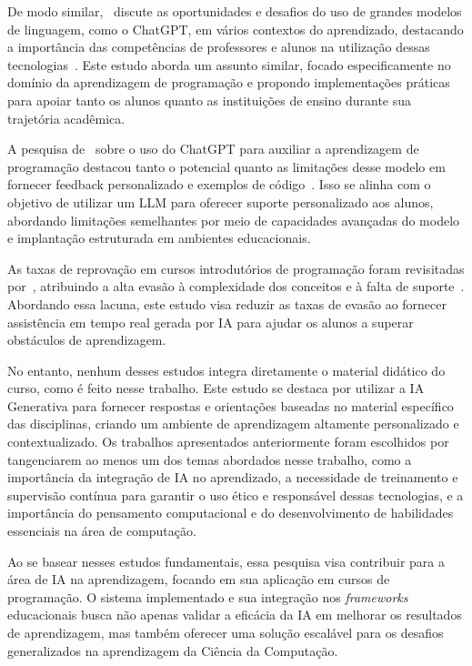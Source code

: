 \documentclass[journal]{IEEEtran}
\begin{document}
De modo similar,~\cite{kasneci2023chatgpt} discute as oportunidades e desafios do uso de grandes modelos de linguagem, como o ChatGPT, em vários contextos do aprendizado, destacando a importância das competências de professores e alunos na utilização dessas tecnologias~\cite{kasneci2023chatgpt}.
Este estudo aborda um assunto similar, focado especificamente no domínio da aprendizagem de programação e propondo implementações práticas para apoiar tanto os alunos quanto as instituições de ensino durante sua trajetória acadêmica.

A pesquisa de~\cite{da2023chatgpt} sobre o uso do ChatGPT para auxiliar a aprendizagem de programação destacou tanto o potencial quanto as limitações desse modelo em fornecer feedback personalizado e exemplos de código~\cite{da2023chatgpt}.
Isso se alinha com o objetivo de utilizar um LLM para oferecer suporte personalizado aos alunos, abordando limitações semelhantes por meio de capacidades avançadas do modelo e implantação estruturada em ambientes educacionais.

As taxas de reprovação em cursos introdutórios de programação foram revisitadas por~\cite{watson2014failure}, atribuindo a alta evasão à complexidade dos conceitos e à falta de suporte~\cite{watson2014failure}.
Abordando essa lacuna, este estudo visa reduzir as taxas de evasão ao fornecer assistência em tempo real gerada por IA para ajudar os alunos a superar obstáculos de aprendizagem.

No entanto, nenhum desses estudos integra diretamente o material didático do curso, como é feito nesse trabalho.
Este estudo se destaca por utilizar a IA Generativa para fornecer respostas e orientações baseadas no material específico das disciplinas, criando um ambiente de aprendizagem altamente personalizado e contextualizado.
Os trabalhos apresentados anteriormente foram escolhidos por tangenciarem ao menos um dos temas abordados nesse trabalho, como a importância da integração de IA no aprendizado, a necessidade de treinamento e supervisão contínua para garantir o uso ético e responsável dessas tecnologias, e a importância do pensamento computacional e do desenvolvimento de habilidades essenciais na área de computação.

Ao se basear nesses estudos fundamentais, essa pesquisa visa contribuir para a área de IA na aprendizagem, focando em sua aplicação em cursos de programação.
O sistema implementado e sua integração nos \textit{frameworks} educacionais busca não apenas validar a eficácia da IA em melhorar os resultados de aprendizagem, mas também oferecer uma solução escalável para os desafios generalizados na aprendizagem da Ciência da Computação.
\end{document}
